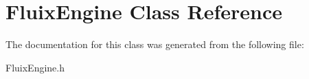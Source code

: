 \hypertarget{class_fluix_engine}{}\section{Fluix\+Engine Class Reference}
\label{class_fluix_engine}


The documentation for this class was generated from the following file\+:\begin{DoxyCompactItemize}
\item 
Fluix\+Engine.\+h\end{DoxyCompactItemize}
